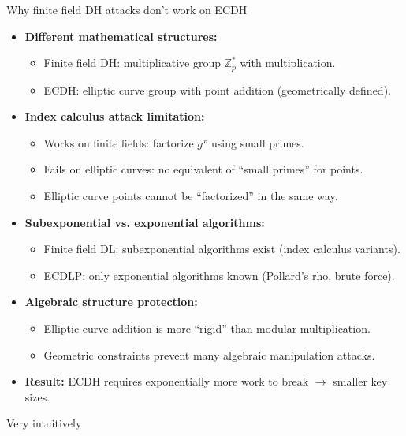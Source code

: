 \documentclass[aspectratio=169, lualatex, handout]{beamer}
\begin{document}
\begin{frame}{Why finite field DH attacks don't work on ECDH}
	\begin{itemize}
		\item \textbf{Different mathematical structures:}
		      \begin{itemize}
			      \item Finite field DH: multiplicative group $\mathbb{Z}_p^*$ with multiplication.
			      \item ECDH: elliptic curve group with point addition (geometrically defined).
		      \end{itemize}
		\item \textbf{Index calculus attack limitation:}
		      \begin{itemize}
			      \item Works on finite fields: factorize $g^x$ using small primes.
			      \item Fails on elliptic curves: no equivalent of ``small primes'' for points.
			      \item Elliptic curve points cannot be ``factorized'' in the same way.
		      \end{itemize}
		\item \textbf{Subexponential vs. exponential algorithms:}
		      \begin{itemize}
			      \item Finite field DL: subexponential algorithms exist (index calculus variants).
			      \item ECDLP: only exponential algorithms known (Pollard's rho, brute force).
		      \end{itemize}
		\item \textbf{Algebraic structure protection:}
		      \begin{itemize}
			      \item Elliptic curve addition is more ``rigid'' than modular multiplication.
			      \item Geometric constraints prevent many algebraic manipulation attacks.
		      \end{itemize}
		\item \textbf{Result:} ECDH requires exponentially more work to break $\rightarrow$ smaller key sizes.
	\end{itemize}
\end{frame}

\begin{frame}{Very intuitively}
	\begin{columns}
		\begin{column}{0.5\textwidth}
		\end{column}
		\begin{column}{0.5\textwidth}
		\end{column}
	\end{columns}
\end{frame}
\end{document}
